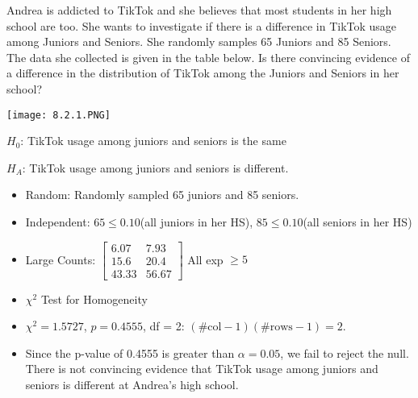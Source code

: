 \documentclass[../stats.tex]{subfiles}
\begin{document}
\pagebreak
\begin{example}
    Andrea is addicted to TikTok and she believes that most students in her high school are too. She wants to investigate if there is a difference in TikTok usage among Juniors and Seniors.
    She randomly samples 65 Juniors and 85 Seniors. The data she collected is given in the table below. Is there convincing evidence of a difference in the distribution of TikTok among the Juniors and Seniors in her school?

    \begin{center}
        \texttt{[image: 8.2.1.PNG]}
    \end{center}

    $H_0$: TikTok usage among juniors and seniors is the same 

    $H_A$: TikTok usage among juniors and seniors is different.

    \begin{itemize}
        \item Random: Randomly sampled 65 juniors and 85 seniors.
        \item Independent: $65\leq 0.10$(all juniors in her HS), $85\leq 0.10$(all seniors in her HS)
        \item Large Counts: 
        $\begin{bmatrix}
            6.07 & 7.93 \\
            15.6 & 20.4 \\
            43.33 & 56.67
        \end{bmatrix}$
        All exp $\geq 5$

        \item $\chi^2$ Test for Homogeneity
        \item $\chi^2=1.5727$, $p=0.4555$, df = 2: $(\#\text{col}-1)(\#\text{rows}-1)=2$.
        \item Since the p-value of 0.4555 is greater than $\alpha=0.05$, we fail to reject the null. There is not convincing evidence that TikTok usage among juniors and seniors is different at Andrea's high school.
    \end{itemize}
\end{example}
\pagebreak
\end{document}
